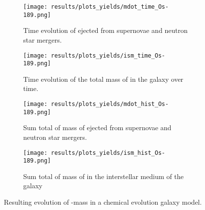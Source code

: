 \begin{figure}
  \begin{subfigure}{\subfigwidth}
    \centering
    \texttt{[image: results/plots\_yields/mdot\_time\_Os-189.png]}
    \caption{Time evolution of  ejected from supernovae and neutron star mergers.}
  \end{subfigure}
  \begin{subfigure}{\subfigwidth}
    \centering
    \texttt{[image: results/plots\_yields/ism\_time\_Os-189.png]}
    \caption{Time evolution of the total mass of  in the galaxy over time.}
  \end{subfigure}
  \begin{subfigure}{\subfigwidth}
    \centering
    \texttt{[image: results/plots\_yields/mdot\_hist\_Os-189.png]}
    \caption{Sum total of mass of  ejected from supernovae and neutron star mergers.}
  \end{subfigure}
  \begin{subfigure}{\subfigwidth}
    \centering
    \texttt{[image: results/plots\_yields/ism\_hist\_Os-189.png]}
    \caption{Sum total of mass of  in the interstellar medium of the galaxy}
  \end{subfigure}
  \caption{Resulting evolution of -mass in a chemical evolution galaxy model.}
\end{figure}
\begin{table}
  
\end{table}

